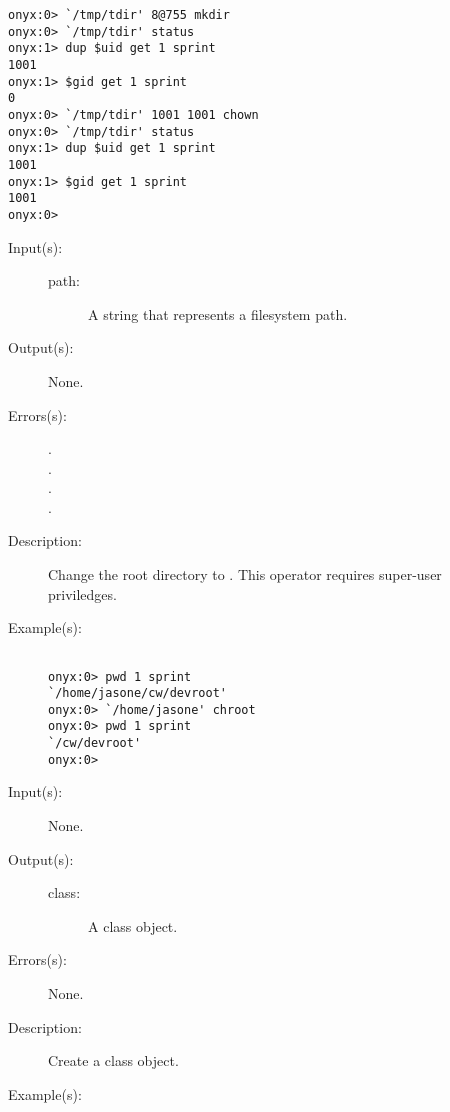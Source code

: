 \begin{description}
\begin{description}
\begin{verbatim}
onyx:0> `/tmp/tdir' 8@755 mkdir
onyx:0> `/tmp/tdir' status
onyx:1> dup $uid get 1 sprint
1001
onyx:1> $gid get 1 sprint
0
onyx:0> `/tmp/tdir' 1001 1001 chown
onyx:0> `/tmp/tdir' status
onyx:1> dup $uid get 1 sprint
1001
onyx:1> $gid get 1 sprint
1001
onyx:0>
		\end{verbatim}
	\end{description}
\label{systemdict:chroot}
\item[{\onyxop{path}{chroot}{--}}: ]
	\begin{description}\item[]
	\item[Input(s): ]
		\begin{description}\item[]
		\item[path: ]
			A string that represents a filesystem path.
		\end{description}
	\item[Output(s): ] None.
	\item[Errors(s): ]
		\begin{description}\item[]
		\item[.]
		\item[.]
		\item[.]
		\item[.]
		\end{description}
	\item[Description: ]
		Change the root directory to .  This operator
		requires super-user priviledges.
	\item[Example(s): ]\begin{verbatim}

onyx:0> pwd 1 sprint
`/home/jasone/cw/devroot'
onyx:0> `/home/jasone' chroot
onyx:0> pwd 1 sprint
`/cw/devroot'
onyx:0>
		\end{verbatim}
	\end{description}
\label{systemdict:class}
\item[{\onyxop{--}{class}{class}}: ]
	\begin{description}\item[]
	\item[Input(s): ] None.
	\item[Output(s): ]
		\begin{description}\item[]
		\item[class: ]
			A class object.
		\end{description}
	\item[Errors(s): ] None.
	\item[Description: ]
		Create a class object.
	\item[Example(s): ]\begin{verbatim}


\end{verbatim}
\end{description}
\end{description}
